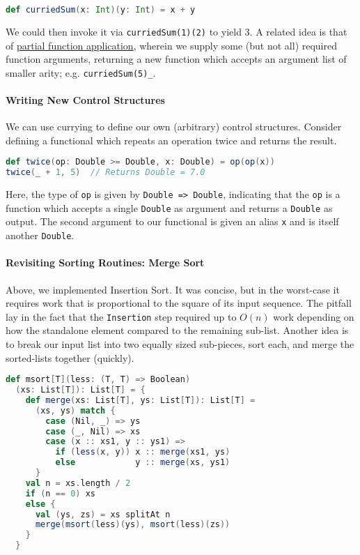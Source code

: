 \documentclass[12pt,letterpaper,twoside]{article}
\begin{document}
\begin{lstlisting}[language=Scala] 
def curriedSum(x: Int)(y: Int) = x + y 
\end{lstlisting} 
We could then invoke it via \texttt{curriedSum(1)(2)} to yield 3. A related idea
is that of 
\href{https://en.wikipedia.org/wiki/Partial_application}{partial function application}, 
wherein we supply some (but not all)
required function arguments, returning a new function which accepts an argument list
of smaller arity; e.g. \texttt{curriedSum(5)\_}.

\paragraph{Writing New Control Structures}
We can use currying to define our own (arbitrary) control structures. Consider defining
a functional which repeats an operation twice and returns the result.
\begin{lstlisting}[language=Scala]
def twice(op: Double >= Double, x: Double) = op(op(x))
twice(_ + 1, 5)  // Returns Double = 7.0 
\end{lstlisting}
Here, the type of \texttt{op} is given by \texttt{Double => Double}, indicating that
the \texttt{op} is a function which accepts a single \texttt{Double} as argument
and returns a \texttt{Double} as output. The second argument to our functional is
given an alias \texttt{x} and is itself another \texttt{Double}.

\paragraph{Revisiting Sorting Routines: Merge Sort} 
Above, we implemented Insertion Sort. It was concise,
but in the worst-case it requires work that is proportional to the square of its input
sequence. The pitfall lay in the fact that the \texttt{Insertion} step required up
to $O(n)$ work depending on how the standalone element compared to the remaining sub-list.
Another idea is to break our input list into two equally sized sub-pieces, sort each, and
merge the sorted-lists together (quickly).

\begin{lstlisting}[language=Scala]
def msort[T](less: (T, T) => Boolean)
  (xs: List[T]): List[T] = {
    def merge(xs: List[T], ys: List[T]): List[T] =
      (xs, ys) match {
        case (Nil, _) => ys
        case (_, Nil) => xs
        case (x :: xs1, y :: ys1) =>
          if (less(x, y)) x :: merge(xs1, ys)
          else            y :: merge(xs, ys1)
      }
    val n = xs.length / 2
    if (n == 0) xs
    else {
      val (ys, zs) = xs splitAt n
      merge(msort(less)(ys), msort(less)(zs))
    }
  }  
\end{lstlisting}
\end{document}
